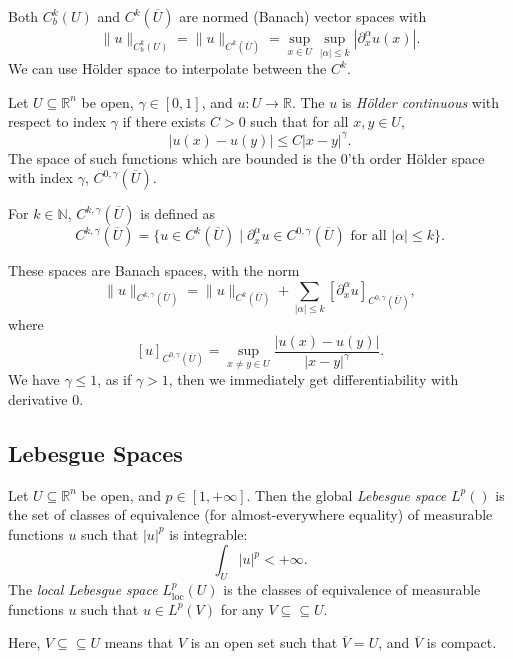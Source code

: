\documentclass[12pt]{article}
\begin{document}
Both $C^{k}_b(U)$ and $C^{k}(\overline{U})$ are normed (Banach) vector spaces with
\[
\|u\|_{C^{k}_b(U)} = \|u\|_{C^k(\overline{U})} = \sup_{x \in U} \sup_{|\alpha| \leq k} |\partial^{\alpha}_x u(x)|.
\]
We can use H\"older space to interpolate between the $C^k$.

\begin{definition}
	Let $U \subseteq \mathbb{R}^n$ be open, $\gamma \in [0, 1]$, and $u : U \to \mathbb{R}$. The $u$ is \emph{H\"older continuous} with respect to index $\gamma$ if there exists $C > 0$ such that for all $x, y \in U$,
	\[
	|u(x) - u(y)| \leq C |x - y|^{\gamma}.
	\]
	The space of such functions which are bounded is the $0$'th order H\"older space with index $\gamma$, $C^{0, \gamma}(\overline{U})$.

	For $k \in \mathbb{N}$, $C^{k, \gamma}(\overline{U})$ is defined as
	\[
		C^{k, \gamma}(\overline{U}) = \{u \in C^{k}(\overline{U}) \mid \partial^{\alpha}_x u \in C^{0, \gamma}(\overline{U}) \text{ for all } |\alpha| \leq k\}.
	\]
\end{definition}

These spaces are Banach spaces, with the norm
\[
	\|u\|_{C^{k, \gamma}(\overline{U})} = \|u\|_{C^{k}(\overline{U})} + \sum_{|\alpha| \leq k} [\partial^{\alpha}_x u]_{C^{0, \gamma}(\overline{U})},
\]
where
\[
	[u]_{C^{0,\gamma}(\overline{U})} = \sup_{x \neq y \in U} \frac{|u(x) - u(y)|}{|x - y|^{\gamma}}.
\]
We have $\gamma \leq 1$, as if $\gamma > 1$, then we immediately get differentiability with derivative 0.

\subsection{Lebesgue Spaces}%
\label{sub:ls}

\begin{definition}
	Let $U \subseteq \mathbb{R}^n$ be open, and $p \in [1, +\infty]$. Then the global \emph{Lebesgue space} $L^p()$ is the set of classes of equivalence (for almost-everywhere equality) of measurable functions $u$ such that $|u|^p$ is integrable:
	\[
	\int_U |u|^p < +\infty.
	\]
	The \emph{local Lebesgue space} $L^p_{\mathrm{loc}}(U)$ is the classes of equivalence of measurable functions $u$ such that $u \in L^p(V)$ for any $V \subseteq \subseteq U$.
\end{definition}

Here, $V \subseteq \subseteq U$ means that $V$ is an open set such that $\overline{V} = U$, and $\overline{V}$ is compact.
\end{document}
